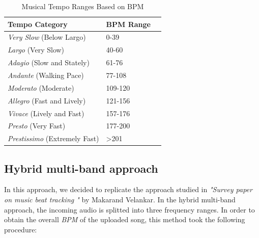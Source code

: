\documentclass{IEEEtran}
\begin{document}
\begin{enumerate}
        \begin{table}[h]
            \centering
            \caption{Musical Tempo Ranges Based on BPM}
            \label{tab:tempo_ranges}
            \begin{tabular}{@{}lll@{}}
            \toprule
            Tempo Category                           & BPM Range     \\ \midrule
            \textit{Very Slow} (Below Largo)         & 0-39          \\
            \textit{Largo} (Very Slow)               & 40-60         \\
            \textit{Adagio} (Slow and Stately)       & 61-76         \\
            \textit{Andante} (Walking Pace)          & 77-108        \\
            \textit{Moderato} (Moderate)             & 109-120       \\
            \textit{Allegro} (Fast and Lively)       & 121-156       \\
            \textit{Vivace} (Lively and Fast)        & 157-176       \\
            \textit{Presto} (Very Fast)              & 177-200       \\
            \textit{Prestissimo} (Extremely Fast)    & \textgreater 201      \\ \bottomrule
            \end{tabular}
        \end{table}
    
\end{enumerate}

\subsection{Hybrid multi-band approach}
In this approach, we decided to replicate the approach studied in \textit{"Survey paper on music beat tracking
"} by Makarand Velankar. In the hybrid multi-band approach, the incoming audio is splitted into three frequency ranges. In order to obtain the overall \textit{BPM} of the uploaded song, this method took the following procedure:
\end{document}
